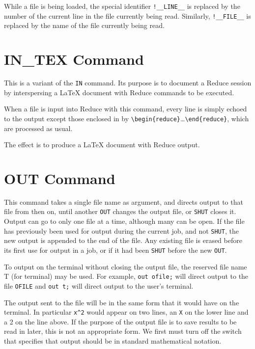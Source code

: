 While a file is being loaded, the special identifier
\texttt{!\_\_LINE\_\_}
is replaced by the number of the current line in the file currently
being read.
Similarly, \texttt{!\_\_FILE\_\_}
is replaced by the name of the file currently
being read.

\section{IN\_TEX Command}
\hypertarget{command:IN_TEX}{}

This is a variant of the \texttt{IN} command. Its purpose is to document a Reduce session
by interspersing a \LaTeX{} document with Reduce commands to be executed.

When a file is input into Reduce with this command, every line is simply echoed to the output
except those enclosed in by \verb+\begin{reduce}+\ldots\verb+\end{reduce}+,
which are processed as usual.

The effect is to produce a \LaTeX{} document with Reduce output.


\section{OUT Command}
\hypertarget{command:OUT}{}
This command takes a single file name as argument, and directs output to
that file from then on, until another \texttt{OUT} changes the output file,
or \texttt{SHUT} closes it.  Output can go to only one file at a time,
although many can be open.  If the file has previously been used for
output during the current job, and not \texttt{SHUT}, the new
output is appended to the end of the file.  Any existing file is erased
before its first use for output in a job, or if it had been \texttt{SHUT}
before the new \texttt{OUT}.

To output on the terminal without closing the output file, the reserved
file name T (for terminal) may be used.  For example,
\texttt{out ofile;} will direct output to the file \texttt{OFILE} and
\texttt{out t;} will direct output to the user's terminal.

The output sent to the file will be in the same form that it would have on
the terminal.  In particular \texttt{x\textasciicircum 2} would appear 
on two lines, an
\texttt{X} on the lower line and a 2 on the line above.  If the purpose of the
output file is to save results to be read in later, this is not an
appropriate form.  We first must turn off the  switch that
specifies that output should be in standard mathematical notation.


